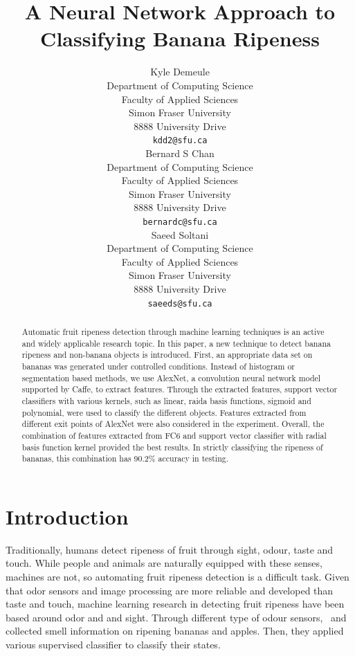 \documentclass{article} %
\title{A Neural Network Approach to Classifying Banana Ripeness}
\author{
Kyle Demeule\\
Department of Computing Science\\
Faculty of Applied Sciences\\
Simon Fraser University\\
8888 University Drive\\
\texttt{kdd2@sfu.ca} \\
\And
Bernard S Chan \\
Department of Computing Science\\
Faculty of Applied Sciences\\
Simon Fraser University\\
8888 University Drive\\
\texttt{bernardc@sfu.ca} \\
\AND
Saeed Soltani\\
Department of Computing Science\\Faculty of Applied Sciences\\
Simon Fraser University\\
8888 University Drive\\
\texttt{saeeds@sfu.ca} \\
}
\begin{document}
\maketitle

\begin{abstract}
Automatic fruit ripeness detection through machine learning techniques is an active and widely applicable research topic. In this paper, a new technique to detect banana ripeness and non-banana objects is introduced. First, an appropriate data set on bananas was generated under controlled conditions. Instead of histogram or segmentation based methods, we use AlexNet, a convolution neural network model supported by Caffe, to extract features. Through the extracted features, support vector classifiers with various kernels, such as linear, raida basis functions, sigmoid and polynomial,  were used to classify the different objects. Features extracted from different exit points of AlexNet were also considered in the experiment. Overall, the combination of features extracted from FC6 and support vector classifier with radial basis function kernel provided the best results. In strictly classifying the ripeness of bananas, this combination has 90.2\% accuracy in testing. \end{abstract}

\section{Introduction}

Traditionally, humans detect ripeness of fruit  through sight, odour, taste and touch. While people and animals are naturally equipped with these senses, machines are not, so automating fruit ripeness detection is a difficult task. Given that odor sensors and image processing are more reliable and developed than taste and touch, machine learning research in detecting fruit ripeness have been based around odor and and sight.  Through different type of odour sensors,~\citet{llobet1999non} and~\citet{li2007neural} collected smell information on ripening bananas and apples. Then, they applied various supervised classifier to classify their states.
\end{document}
